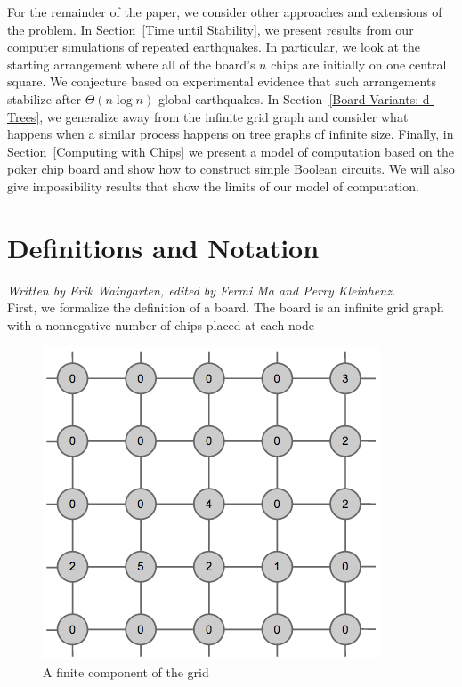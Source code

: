 \documentclass[runningheads,a4paper]{llncs}
\begin{document}
For the remainder of the paper, we consider other approaches and extensions of the problem. 
In  Section~\ref{Time until Stability}, we present results from our computer simulations of repeated earthquakes. In particular, we look at the starting arrangement where all of the board's $n$ chips are initially on one central square.
We conjecture based on experimental evidence that such arrangements stabilize after $\Theta(n \log n)$ global earthquakes. 
In Section~\ref{Board Variants: d-Trees}, we generalize away from the infinite grid graph and consider what happens when a similar process happens on tree graphs of infinite size. 
Finally, in Section~\ref{Computing with Chips} we present a model of computation based on the poker chip board and show how to construct simple Boolean circuits. We will also give impossibility results that show the limits of our model of computation.
\section{Definitions and Notation}
\label{Definitions and Notation}

\emph{Written by Erik Waingarten, edited by Fermi Ma and Perry Kleinhenz.}\\

First, we formalize the definition of a board. The board is an infinite grid graph with a nonnegative number of chips placed at each node
\begin{figure}
\begin{center}
\includegraphics[scale=0.5]{grid1.png}
\end{center}
\caption{A finite component of the grid}
\end{figure}
\end{document}
